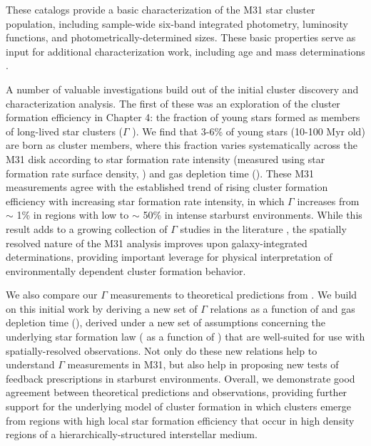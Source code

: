 \documentclass[11pt, titlepage, twoside]{article}
\begin{document}
These catalogs provide a basic characterization of the M31 star cluster population, including sample-wide six-band integrated photometry, luminosity functions, and photometrically-determined sizes. These basic properties serve as input for additional characterization work, including age and mass determinations .

A number of valuable investigations build out of the initial cluster discovery and characterization analysis. The first of these was an exploration of the cluster formation efficiency in Chapter 4: the fraction of young stars formed as members of long-lived star clusters ($\Gamma$ ). We find that 3-6\% of young stars (10-100 Myr old) are born as cluster members, where this fraction varies systematically across the M31 disk according to star formation rate intensity (measured using star formation rate surface density, ) and gas depletion time (). These M31 measurements agree with the established trend of rising cluster formation efficiency with increasing star formation rate intensity, in which $\Gamma$ increases from $\sim$ 1\% in regions with low to $\sim$ 50\% in intense starburst environments. While this result adds to a growing collection of $\Gamma$ studies in the literature , the spatially resolved nature of the M31 analysis improves upon galaxy-integrated determinations, providing important leverage for physical interpretation of environmentally dependent cluster formation behavior.

We also compare our $\Gamma$ measurements to theoretical predictions from . We build on this initial work by deriving a new set of $\Gamma$ relations as a function of and gas depletion time (), derived under a new set of assumptions concerning the underlying star formation law ( as a function of ) that are well-suited for use with spatially-resolved observations. Not only do these new relations help to understand $\Gamma$ measurements in M31, but also help in proposing new tests of feedback prescriptions in starburst environments. Overall, we demonstrate good agreement between theoretical predictions and observations, providing further support for the underlying model of cluster formation in which clusters emerge from regions with high local star formation efficiency that occur in high density regions of a hierarchically-structured interstellar medium.
\end{document}
